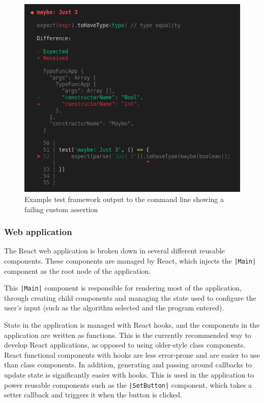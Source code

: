 \documentclass[a4paper,fleqn,12pt]{article}
\begin{document}
{\centering \begin{figure}[h!]
  \centering
  \includegraphics[width=0.769\linewidth]{images/image9.png}
  \caption{Example test framework output to the command line showing a failing custom assertion}
\end{figure} \par}
\subsubsection{Web application}\label{id:h.jqmg1n3w35mp}
The React web application is broken down in several different reusable components. These components are managed by React, which injects the \texttt{|Main|} component as the root node of the application.

This \texttt{|Main|} component is responsible for rendering most of the application, through creating child components and managing the state used to configure the user’s input (such as the algorithm selected and the program entered).

State in the application is managed with React hooks, and the components in the application are written as functions. This is the currently recommended way to develop React applications, as opposed to using older-style class components. React functional components with hooks are less error-prone and are easier to use than class components. In addition, generating and passing around callbacks to update state is significantly easier with hooks. This is used in the application to power reusable components such as the \texttt{|SetButton|} component, which takes a setter callback and triggers it when the button is clicked.
\end{document}
